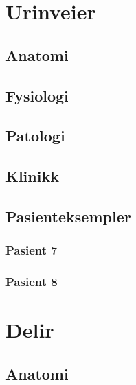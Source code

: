 \documentclass[a4paper,12pt,twoside]{memoir}
\begin{document}
\sffamily

			\renewcommand{\chaptername}{Del}
            \renewcommand{\contentsname}{Innhold}
            \renewcommand\listfigurename{Illustrasjoner}
            \renewcommand\tablename{Tabell}
			\renewcommand\listtablename{Tabeller}
            \renewcommand{\figurename}{Illustrasjon}


\frontmatter
	
	
\mainmatter
	\chapter{Urinveier}
		\section{Anatomi}
		\section{Fysiologi}
		\section{Patologi}
		\section{Klinikk}
		\section{Pasienteksempler}
			\subsection{Pasient 7}
			\subsection{Pasient 8}
	\chapter{Delir}
		\section{Anatomi}
\end{document}

